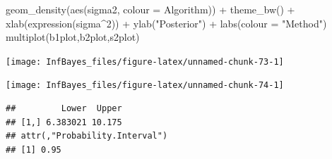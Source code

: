 \documentclass[
]{book}
\newenvironment{Shaded}{\begin{snugshade}}{\end{snugshade}}
\newcommand{\AttributeTok}[1]{\textcolor[rgb]{0.77,0.63,0.00}{#1}}
\newcommand{\ConstantTok}[1]{\textcolor[rgb]{0.00,0.00,0.00}{#1}}
\newcommand{\DecValTok}[1]{\textcolor[rgb]{0.00,0.00,0.81}{#1}}
\newcommand{\FunctionTok}[1]{\textcolor[rgb]{0.00,0.00,0.00}{#1}}
\newcommand{\NormalTok}[1]{#1}
\newcommand{\SpecialCharTok}[1]{\textcolor[rgb]{0.00,0.00,0.00}{#1}}
\newcommand{\StringTok}[1]{\textcolor[rgb]{0.31,0.60,0.02}{#1}}
\begin{document}
\begin{Shaded}
\begin{Highlighting}[]
  \FunctionTok{geom\_density}\NormalTok{(}\FunctionTok{aes}\NormalTok{(sigma2, }\AttributeTok{colour =}\NormalTok{ Algorithm)) }\SpecialCharTok{+} \FunctionTok{theme\_bw}\NormalTok{() }\SpecialCharTok{+}
  \FunctionTok{xlab}\NormalTok{(}\FunctionTok{expression}\NormalTok{(sigma}\SpecialCharTok{\^{}}\DecValTok{2}\NormalTok{)) }\SpecialCharTok{+} \FunctionTok{ylab}\NormalTok{(}\StringTok{"Posterior"}\NormalTok{) }\SpecialCharTok{+} \FunctionTok{labs}\NormalTok{(}\AttributeTok{colour =} \StringTok{"Method"}\NormalTok{)}
\FunctionTok{multiplot}\NormalTok{(b1plot,b2plot,s2plot)}
\end{Highlighting}
\end{Shaded}

\begin{center}\texttt{[image: InfBayes\_files/figure-latex/unnamed-chunk-73-1]} \end{center}

\begin{Shaded}
\end{Shaded}

\begin{center}\texttt{[image: InfBayes\_files/figure-latex/unnamed-chunk-74-1]} \end{center}

\begin{verbatim}
##         Lower  Upper
## [1,] 6.383021 10.175
## attr(,"Probability.Interval")
## [1] 0.95
\end{verbatim}
\end{document}
